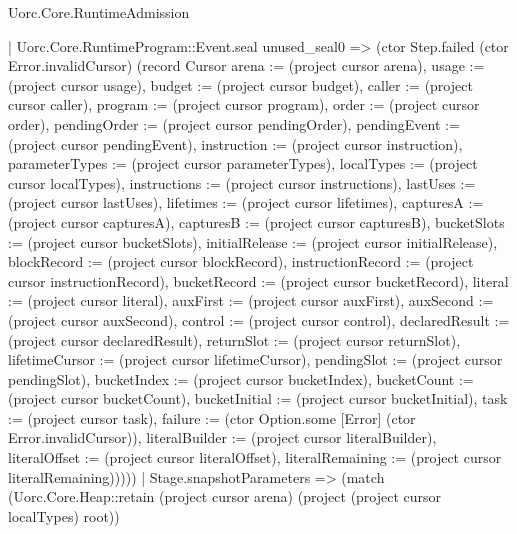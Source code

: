 \begin{lexlean}{Uorc.Core.RuntimeAdmission}
\begin{semanticmodule}
{          | Uorc.Core.RuntimeProgram::Event.seal unused_seal0 => (ctor Step.failed (ctor Error.invalidCursor) (record Cursor {arena := (project cursor arena), usage := (project cursor usage), budget := (project cursor budget), caller := (project cursor caller), program := (project cursor program), order := (project cursor order), pendingOrder := (project cursor pendingOrder), pendingEvent := (project cursor pendingEvent), instruction := (project cursor instruction), parameterTypes := (project cursor parameterTypes), localTypes := (project cursor localTypes), instructions := (project cursor instructions), lastUses := (project cursor lastUses), lifetimes := (project cursor lifetimes), capturesA := (project cursor capturesA), capturesB := (project cursor capturesB), bucketSlots := (project cursor bucketSlots), initialRelease := (project cursor initialRelease), blockRecord := (project cursor blockRecord), instructionRecord := (project cursor instructionRecord), bucketRecord := (project cursor bucketRecord), literal := (project cursor literal), auxFirst := (project cursor auxFirst), auxSecond := (project cursor auxSecond), control := (project cursor control), declaredResult := (project cursor declaredResult), returnSlot := (project cursor returnSlot), lifetimeCursor := (project cursor lifetimeCursor), pendingSlot := (project cursor pendingSlot), bucketIndex := (project cursor bucketIndex), bucketCount := (project cursor bucketCount), bucketInitial := (project cursor bucketInitial), task := (project cursor task), failure := (ctor Option.some [Error] (ctor Error.invalidCursor)), literalBuilder := (project cursor literalBuilder), literalOffset := (project cursor literalOffset), literalRemaining := (project cursor literalRemaining)}))))
      | Stage.snapshotParameters => (match (Uorc.Core.Heap::retain (project cursor arena) (project (project cursor localTypes) root))
}
\end{semanticmodule}
\end{lexlean}
